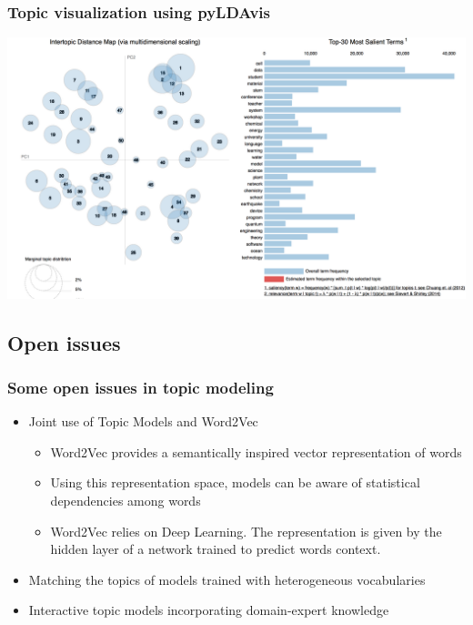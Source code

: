 \documentclass{beamer}
\begin{document}
\begin{frame}

    \frametitle{Topic visualization using pyLDAvis}

	\centerline{\includegraphics[width=\textwidth]{./figs/NLPTM_pyLDAvis.png}}
	
\end{frame}


\subsection{Open issues}

\begin{frame}

    \frametitle{Some open issues in topic modeling}

	\begin{itemize}
		\item Joint use of Topic Models and Word2Vec
		\begin{itemize}
			\item Word2Vec provides a semantically inspired vector representation of words
			\item Using this representation space, models can be aware of statistical dependencies among words
			\item Word2Vec relies on Deep Learning. The representation is given by the hidden layer of a network trained to predict words context.
		\end{itemize}
		\item Matching the topics of models trained with heterogeneous vocabularies
		\item Interactive topic models incorporating domain-expert knowledge
	\end{itemize}
	
\end{frame}
\end{document}
